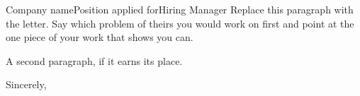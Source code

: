 \documentclass{resume}
\begin{document}
\makeheader

\begin{coverletter}{Company name}{Position applied for}{Hiring Manager}
Replace this paragraph with the letter. Say which problem of theirs you would work on first and
point at the one piece of your work that shows you can.

A second paragraph, if it earns its place.

Sincerely,\par
\resumename
\end{coverletter}

\makefooter
\end{document}
